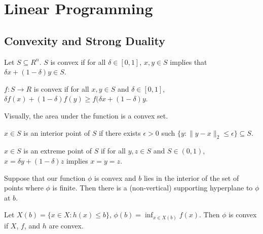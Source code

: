 
\chapter{Linear Programming}
\label{cha:linear-programming}

\section{Convexity and Strong Duality}
\label{sec:conv-strong-dual-1}

\begin{defn}
  \label{defn:linear_programming:1}
  Let $S \subseteq R^{n}$.  $S$ is convex if for all $\delta \in [0,
  1]$, $x, y \in S$ implies that $\delta x + (1 - \delta) y \in S$.

  $f: S \rightarrow R$ is convex if for all $x, y \in S$ and $\delta
  \in [0, 1]$, $\delta f(x) + (1-\delta) f(y) \geq f(\delta x + (1 -
  \delta)y$.

  Visually, the area under the function is a convex set.
\end{defn}

\begin{defn}
  \label{defn:linear_programming:2}
  $x \in S$ is an interior point of $S$ if there exists $\epsilon > 0$
  such $\{ y: \| y - x \|_{2} \leq \epsilon \} \subseteq S$.
  
  $x \in S$ is an extreme point of $S$ if for all $y, z \in S$ and $S
  \in (0, 1)$, $x = \delta y + (1 - \delta) z$ implies $x = y = z$.
\end{defn}

\begin{thm}
  \label{thm:linear_programming:supporting-hyperplane}
  Suppose that our function $\phi$ is convex and $b$ lies in the
  interior of the set of points where $\phi$ is finite.
  Then there is a (non-vertical) supporting hyperplane to $\phi$ at
  $b$.
\end{thm}

\begin{thm}
  Let $X(b) = \{ x \in X : h(x) \leq b \}$, $\phi(b) = \inf_{x \in
    X(b)} f(x)$.  Then $\phi$ is convex if $X$, $f$, and $h$ are convex.
\end{thm}

